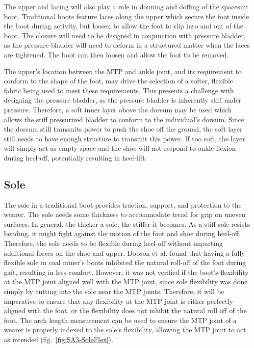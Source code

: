 \documentclass[defaultstyle,11pt]{thesis}
\begin{document}
The upper and lacing will also play a role in donning and doffing of the spacesuit boot.
Traditional boots feature laces along the upper which secure the foot inside the boot during activity, but loosen to allow the foot to slip into and out of the boot.
The closure will need to be designed in conjunction with pressure bladder, as the pressure bladder will need to deform in a structured matter when the laces are tightened.
The boot can then loosen and allow the foot to be removed.

The upper's location between the MTP and ankle joint, and its requirement to conform to the shape of the foot, may drive the selection of a softer, flexible fabric being used to meet these requirements.
This presents a challenge with designing the pressure bladder, as the pressure bladder is inherently stiff under pressure.
Therefore, a soft inner layer above the dorsum may be used which allows the stiff pressurized bladder to conform to the individual's dorsum.
Since the dorsum still transmits power to push the shoe off the ground, the soft layer still needs to have enough structure to transmit this power.
If too soft, the layer will simply act as empty space and the shoe will not respond to ankle flexion during heel-off, potentially resulting in heel-lift.

\hypertarget{sole}{%
\subsection{Sole}\label{sole}}

The sole in a traditional boot provides traction, support, and protection to the wearer.
The sole needs some thickness to accommodate tread for grip on uneven surfaces.
In general, the thicker a sole, the stiffer it becomes.
As a stiff sole resists bending, it might fight against the motion of the foot and shoe during heel-off.
Therefore, the sole needs to be flexible during heel-off without imparting additional forces on the shoe and upper.
Dobson et al. \citep{Dobson2020} found that having a fully flexible sole in coal miner's boots inhibited the natural roll-off of the foot during gait, resulting in less comfort.
However, it was not verified if the boot's flexibility at the MTP joint aligned well with the MTP joint, since sole flexibility was done simply by cutting into the sole near the MTP joints.
Therefore, it will be imperative to ensure that any flexibility at the MTP joint is either perfectly aligned with the foot, or the flexibility does not inhibit the natural roll off of the foot.
The arch length measurement can be used to ensure the MTP joint of a wearer is properly indexed to the sole's flexibility, allowing the MTP joint to act as intended (fig.~\ref{fig:SA3-SoleFlex}).
\end{document}

